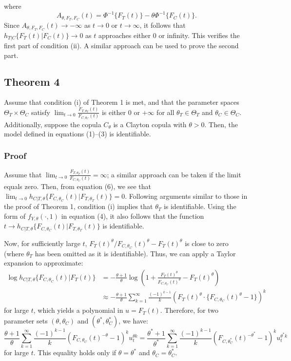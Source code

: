 where 
\[
A_{\theta, F_T, F_C}(t) = \Phi^{-1}\{F_T(t)\} - \theta \Phi^{-1}\{F_C(t)\}.
\]
Since \(A_{\theta, F_T, F_C}(t) \to -\infty\) as \(t \to 0\) or \(t \to \infty\), it follows that \(h_{T|C}\{F_T(t) | F_C(t)\} \to 0\) as \(t\) approaches either 0 or infinity. This verifies the first part of condition (ii). A similar approach can be used to prove the second part.

\subsection*{Theorem 4}
Assume that condition (i) of Theorem 1 is met, and that the parameter spaces \( \Theta_T \times \Theta_C \) satisfy \(\lim_{t \to 0} \frac{F_{T, \theta_T}(t)}{F_{C, \theta_C}(t)}\) is either \(0\) or \(+\infty\) for all \(\theta_T \in \Theta_T\) and \(\theta_C \in \Theta_C\). Additionally, suppose the copula \( C_{\theta} \) is a Clayton copula with \(\theta > 0\). Then, the model defined in equations (1)–(3) is identifiable.

\subsubsection*{Proof}
Assume that \(\lim_{t \to 0} \frac{F_{T, \theta_T}(t)}{F_{C, \theta_C}(t)} = \infty\); a similar approach can be taken if the limit equals zero. Then, from equation (6), we see that \(\lim_{t \to 0} h_{C|T, \theta} \{F_{C, \theta_C}(t) | F_{T, \theta_T}(t)\} = 0\). Following arguments similar to those in the proof of Theorem 1, condition (i) implies that \(\theta_T\) is identifiable. Using the form of \(f_{Y, \theta}(\cdot, 1)\) in equation (4), it also follows that the function \(t \to h_{C|T, \theta} \{F_{C, \theta_C}(t) | F_{T, \theta_T}(t)\}\) is identifiable.

Now, for sufficiently large \(t\), \(F_{T}(t)^\theta / F_{C, \theta_C}(t)^\theta - F_{T}(t)^\theta\) is close to zero (where \(\theta_T\) has been omitted as it is identifiable). Thus, we can apply a Taylor expansion to approximate:
\begin{align*}
\log h_{C|T, \theta} \{F_{C, \theta_C}(t) | F_{T}(t)\} &= -\frac{\theta + 1}{\theta} \log \left( 1 + \frac{F_{T}(t)^\theta}{F_{C, \theta_C}(t)^\theta } - F_{T}(t)^\theta \right)\\
&\approx -\frac{\theta + 1}{\theta} \sum_{k=1}^{\infty} \frac{(-1)^{k-1}}{k} \left( {F_{T}(t)^\theta} \cdot \{ {F_{C, \theta_C}(t)^\theta - 1\}} \right)^k
\end{align*}
for large \(t\), which yields a polynomial in \(u = F_{T}(t)\). Therefore, for two parameter sets \((\theta, \theta_C)\) and \((\theta^*, \theta_C^*)\), we have:
\[
\frac{\theta + 1}{\theta} \sum_{k=1}^{\infty} \frac{(-1)^{k-1}}{k} \left( F_{C, \theta_C}(t)^{-\theta} - 1 \right)^k u_t^{\theta k} = \frac{\theta^* + 1}{\theta^*} \sum_{k=1}^{\infty} \frac{(-1)^{k-1}}{k} \left( F_{C, \theta_C^*}(t)^{-\theta^*} - 1 \right)^k u_t^{\theta^* k}
\]
for large \(t\). This equality holds only if \(\theta = \theta^*\) and \(\theta_C = \theta_C^*\).

